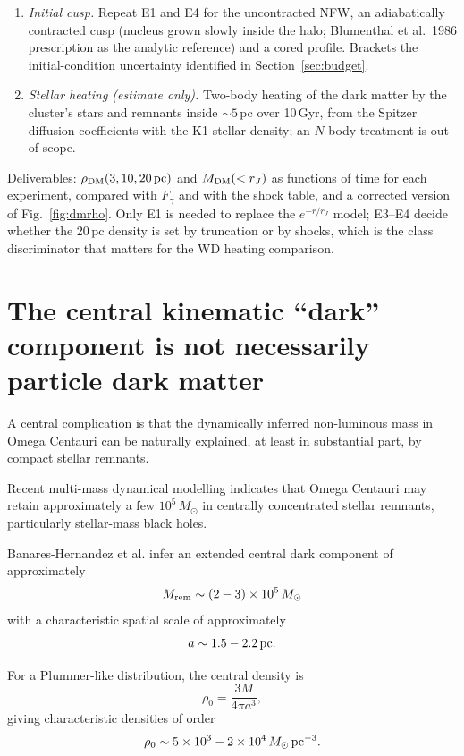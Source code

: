 \documentclass[11pt,a4paper]{article}
\begin{document}
\begin{enumerate}[label=E\arabic*.]
\item \emph{Initial cusp.} Repeat E1 and E4 for the uncontracted NFW, an adiabatically contracted cusp (nucleus grown slowly inside the halo; Blumenthal et al.\ 1986 prescription as the analytic reference) and a cored profile. Brackets the initial-condition uncertainty identified in Section~\ref{sec:budget}.
\item \emph{Stellar heating (estimate only).} Two-body heating of the dark matter by the cluster's stars and remnants inside $\sim5$\,pc over 10\,Gyr, from the Spitzer diffusion coefficients with the K1 stellar density; an $N$-body treatment is out of scope.
\end{enumerate}
Deliverables: $\rho_{\rm DM}(3,10,20\,{\rm pc})$ and $M_{\rm DM}(<r_J)$ as functions of time for each experiment, compared with $F_\gamma$ and with the shock table, and a corrected version of Fig.~\ref{fig:dmrho}. Only E1 is needed to replace the $e^{-r/r_J}$ model; E3--E4 decide whether the 20\,pc density is set by truncation or by shocks, which is the class discriminator that matters for the WD heating comparison.

\section{The central kinematic ``dark'' component is not necessarily particle dark matter}

A central complication is that the dynamically inferred non-luminous mass in Omega Centauri can be naturally explained, at least in substantial part, by compact stellar remnants.

Recent multi-mass dynamical modelling indicates that Omega Centauri may retain approximately a few $10^5\,M_\odot$ in centrally concentrated stellar remnants, particularly stellar-mass black holes.

Banares-Hernandez et al. infer an extended central dark component of approximately
\begin{equation}
M_{\rm rem}\sim(2-3)\times10^5\,M_\odot
\end{equation}
with a characteristic spatial scale of approximately
\begin{equation}
a\sim1.5-2.2\,{\rm pc}.
\end{equation}

For a Plummer-like distribution, the central density is
\begin{equation}
\rho_0 =
\frac{3M}{4\pi a^3},
\end{equation}
giving characteristic densities of order
\begin{equation}
\rho_0\sim5\times10^3-
2\times10^4\,
M_\odot\,{\rm pc}^{-3}.
\end{equation}
\end{document}
